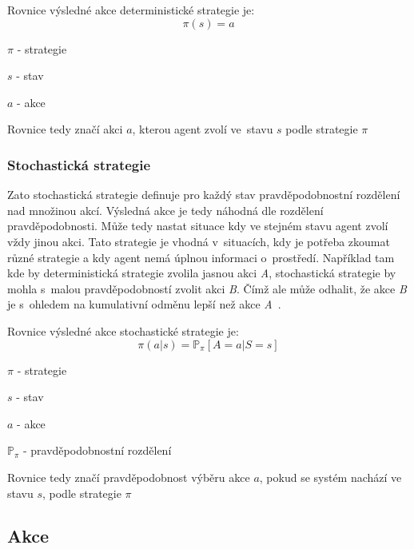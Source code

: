   Rovnice výsledné akce deterministické strategie je:
  \begin{equation}
    \pi(s) = a\label{eq:policy_deterministic}
  \end{equation}
\begin{myitemize}
  \item $\pi$ - strategie
  \item $s$ - stav
  \item $a$ - akce
  \item Rovnice tedy značí akci $a$, kterou agent zvolí ve~stavu $s$ podle strategie $\pi$

\end{myitemize}

  \subsubsection*{Stochastická strategie}
  
  Zato stochastická strategie definuje pro každý stav pravděpodobnostní rozdělení nad množinou akcí.
  Výsledná akce je tedy náhodná dle rozdělení pravděpodobnosti.
  Může tedy nastat situace kdy ve stejném stavu agent zvolí vždy jinou akci.
  Tato strategie je vhodná v~situacích, kdy je potřeba zkoumat různé strategie a kdy agent nemá úplnou informaci o~prostředí.
  Například tam kde by deterministická strategie zvolila jasnou akci \textit{A}, stochastická strategie by mohla s~malou pravděpodobností zvolit akci \textit{B}.
  Čímž ale může odhalit, že akce \textit{B} je s~ohledem na kumulativní odměnu lepší než akce \textit{A}~\cite{Policies}.

  Rovnice výsledné akce stochastické strategie je:
  \begin{equation}
    \pi(a \vert s) = \mathbb{P}_\pi [A=a \vert S=s]\label{eq:policy_stochastic}
  \end{equation}

  \begin{myitemize}
    \item $\pi$ - strategie
    \item $s$ - stav
    \item $a$ - akce
    \item $\mathbb{P}_\pi$ - pravděpodobnostní rozdělení
    \item Rovnice tedy značí pravděpodobnost výběru akce $a$, pokud se systém nachází ve stavu $s$, podle strategie $\pi$
  \end{myitemize}
  

\subsection{Akce}\label{subsec:akce}

